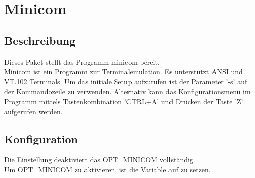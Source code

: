 {
\section {Minicom}
}

\subsection {Beschreibung}
  Dieses Paket stellt das Programm minicom bereit.\\
  Minicom ist ein Programm zur Terminalemulation. Es unterstützt ANSI und VT.102
  Terminals. Um das initiale Setup aufzurufen ist der Parameter '-s' auf der
  Kommandozeile zu verwenden. Alternativ kann das Konfigurationsmenü im Programm
  mittels Tastenkombination 'CTRL+A' und Drücken der Taste 'Z' aufgerufen
  werden.

\subsection{Konfiguration}

\begin{description}

  Die Einstellung  deaktiviert das OPT\_MINICOM vollständig.\\
  Um OPT\_MINICOM zu aktivieren, ist die Variable  auf 
   zu setzen.

\end{description}
